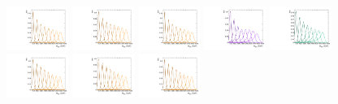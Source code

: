 \begin{figure}[htbp]
  \centering
  \includegraphics[width=0.18\textwidth]{fig/2Dfit/templateSignalVsMX_fromDC_GbuToWW_MVV_mu_HP_bb_HDy.pdf}
  \includegraphics[width=0.18\textwidth]{fig/2Dfit/templateSignalVsMX_fromDC_RadToWW_MVV_mu_HP_bb_HDy.pdf}
  \includegraphics[width=0.18\textwidth]{fig/2Dfit/templateSignalVsMX_fromDC_ZprToWW_MVV_mu_HP_bb_HDy.pdf}
  \includegraphics[width=0.18\textwidth]{fig/2Dfit/templateSignalVsMX_fromDC_WprToWZ_MVV_mu_HP_bb_HDy.pdf}
  \includegraphics[width=0.18\textwidth]{fig/2Dfit/templateSignalVsMX_fromDC_WprToWH_MVV_mu_HP_bb_HDy.pdf}\\
  \includegraphics[width=0.18\textwidth]{fig/2Dfit/templateSignalVsMX_fromDC_GbuToWW_MVV_mu_LP_bb_HDy.pdf}
  \includegraphics[width=0.18\textwidth]{fig/2Dfit/templateSignalVsMX_fromDC_RadToWW_MVV_mu_LP_bb_HDy.pdf}
  \includegraphics[width=0.18\textwidth]{fig/2Dfit/templateSignalVsMX_fromDC_ZprToWW_MVV_mu_LP_bb_HDy.pdf}

\end{figure}
